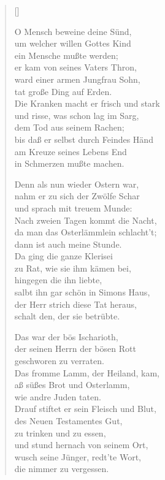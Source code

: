 \begin{multicols}{2}
\settowidth{\versewidth}{Steck ein das Schwert, sprach unser Licht,}
\begin{verse}[\versewidth]

 O Mensch beweine deine Sünd,\\
um welcher willen Gottes Kind\\
ein Mensche mußte werden;\\
er kam von seines Vaters Thron,\\
ward einer armen Jungfrau Sohn,\\
tat große Ding auf Erden.\\
Die Kranken macht er frisch und stark\\
und risse, was schon lag im Sarg,\\
dem Tod aus seinem Rachen;\\
bis daß er selbst durch Feindes Händ\\
am Kreuze seines Lebens End\\
in Schmerzen mußte machen.

 Denn als nun wieder Ostern war,\\
nahm er zu sich der Zwölfe Schar\\
und sprach mit treuem Munde:\\
Nach zweien Tagen kommt die Nacht,\\
da man das Osterlämmlein schlacht't;\\
dann ist auch meine Stunde.\\
Da ging die ganze Klerisei\\
zu Rat, wie sie ihm kämen bei,\\
hingegen die ihn liebte,\\
salbt ihn gar schön in Simons Haus,\\
der Herr strich diese Tat heraus,\\
schalt den, der sie betrübte.

 Das war der bös Ischarioth,\\
der seinen Herrn der bösen Rott\\
geschworen zu verraten.\\
Das fromme Lamm, der Heiland, kam,\\
aß süßes Brot und Osterlamm,\\
wie andre Juden taten.\\
Drauf stiftet er sein Fleisch und Blut,\\
des Neuen Testamentes Gut,\\
zu trinken und zu essen,\\
und stund hernach von seinem Ort,\\
wusch seine Jünger, redt'te Wort,\\
die nimmer zu vergessen.


\end{verse}
\end{multicols}
